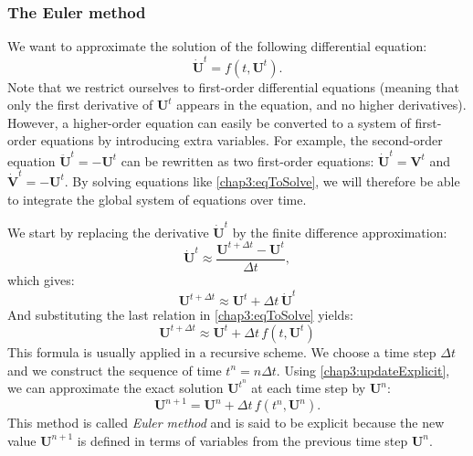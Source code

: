 		\subsubsection*{The Euler method}	
We want to approximate the solution of the following differential equation:
\begin{equation}
\label{chap3:eqToSolve}
\mathbf{\dot U}^t = f(t, \mathbf{U}^t).
\end{equation}
Note that we restrict ourselves to first-order differential equations (meaning that only the first derivative of $\mathbf{U}^t$ appears in the equation, and no higher derivatives). However, a higher-order equation can easily be converted to a system of first-order equations by introducing extra variables. For example, the second-order equation $\mathbf{\ddot U}^t = -\mathbf{U}^t$ can be rewritten as two first-order equations: $\mathbf{\dot U}^t = \mathbf{V}^t$ and $\mathbf{\dot V}^t = -\mathbf{U}^t$. By solving equations like \eqref{chap3:eqToSolve}, we will therefore be able to integrate the global system of equations over time. 

We start by replacing the derivative $\mathbf{\dot U}^t $ by the finite difference approximation:
\begin{equation}
\label{chap3:approxExplicit}
\mathbf{\dot U}^t \approx \dfrac{\mathbf{U}^{t+\Delta t} - \mathbf{U}^t}{\Delta t},
\end{equation}
which gives:
\begin{equation}
\mathbf{U}^{t+\Delta t} \approx \mathbf{U}^t + \Delta t \, \mathbf{\dot U}^t
\end{equation}
And substituting the last relation in \eqref{chap3:eqToSolve} yields:
\begin{equation}
\label{chap3:updateExplicit}
\mathbf{U}^{t+\Delta t} \approx \mathbf{U}^t + \Delta t \, f(t, \mathbf{U}^t)
\end{equation}
This formula is usually applied in a recursive scheme. We choose a time step $ \Delta t $ and we construct the sequence of time $ t^n = n \Delta t$. Using \eqref{chap3:updateExplicit}, we can approximate the exact solution $ \mathbf{U}^{t^n} $ at each time step by $ \mathbf{U}^n $:
\begin{equation}
\mathbf{U}^{n+1} = \mathbf{U}^n + \Delta t \, f(t^n, \mathbf{U}^n).
\end{equation}
This method is called \emph{Euler method} and is said to be explicit because the new value $ \mathbf{U}^{n+1} $ is defined in terms of variables from the previous time step $ \mathbf{U}^n $.


